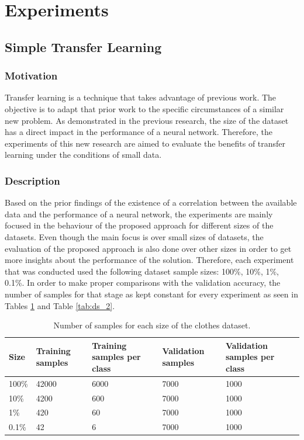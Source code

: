 \documentclass{article}
\begin{document}
\section{Experiments}
\label{sec:experiments}

\subsection{Simple Transfer Learning}

\subsubsection{\textbf{Motivation}}

Transfer learning is a technique that takes advantage of previous work. The objective is to adapt that prior work to the specific circumstances of a similar new problem. As demonstrated in the previous research, the size of the dataset has a direct impact in the performance of a neural network. Therefore, the experiments of this new research are aimed to evaluate the benefits of transfer learning under the conditions of small data.

\subsubsection{\textbf{Description}}

Based on the prior findings of the existence of a correlation between the available data and the performance of a neural network, the experiments are mainly focused in the behaviour of the proposed approach for different sizes of the datasets. Even though the main focus is over small sizes of datasets, the evaluation of the proposed approach is also done over other sizes in order to get more insights about the performance of the solution. Therefore, each experiment that was conducted used the following dataset sample sizes: 100\%, 10\%, 1\%, 0.1\%. In order to make proper comparisons with the validation accuracy, the number of samples for that stage as kept constant for every experiment as seen in Tables \ref{tab:ds_1} and Table \ref{tab:ds_2}.

\begin{table}[!htb]
  \centering
  \begin{tabular}{| l | l | l | l | l |}
    \hline
    \textbf{Size} & \textbf{Training samples} & \textbf{Training samples per class} & \textbf{Validation samples} & \textbf{Validation samples per class} \\ \hline
    100\% & 42000 & 6000 & 7000 & 1000 \\ \hline
    10\% & 4200 & 600 & 7000 & 1000 \\ \hline
    1\% & 420  & 60 & 7000 & 1000 \\ \hline
    0.1\% & 42 & 6 & 7000 & 1000 \\ \hline
  \end{tabular}
  \caption{Number of samples for each size of the clothes dataset.}
  \label{tab:ds_1}
\end{table}  
  
\end{document}
